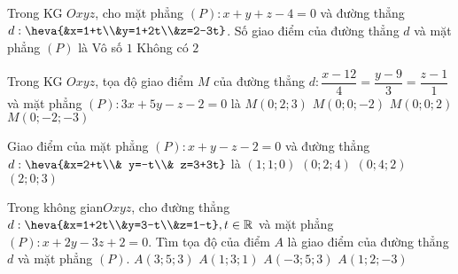 \begin{ex}%
Trong KG $Oxyz$, cho mặt phẳng $(P):x+y+z-4=0$ và đường thẳng $d:\heva{&x=1+t\\&y=1+2t\\&z=2-3t}$. Số giao điểm của đường thẳng $d$ và mặt phẳng $(P)$ là
\choice
{\True Vô số}
{$1$}
{Không có}
{$2$}
\end{ex}

\begin{ex}%
Trong KG $Oxyz$, tọa độ giao điểm $M$ của đường thẳng $d:\dfrac{x-12}{4}=\dfrac{y-9}{3}=\dfrac{z-1}{1}$ và mặt phẳng $(P):3x+5y-z-2=0$ là
\choice
{$M(0;2;3)$}
{\True $M(0;0;-2)$}
{$M(0;0;2)$}
{$M(0;-2;-3)$}
\end{ex}

\begin{ex}%
Giao điểm của mặt phẳng $(P):x+y-z-2=0$ và đường thẳng $d:\heva{&x=2+t\\& y=-t\\& z=3+3t}$ là
\choice
{\True $(1;1;0)$}
{$(0;2;4)$}
{$(0;4;2)$}
{$(2;0;3)$}
\end{ex}

\begin{ex}%
Trong không gian$ Oxyz$, cho đường thẳng $d:\heva{&x=1+2t\\&y=3-t\\&z=1-t}, t\in\mathbb{R}$ và mặt phẳng $(P):x+2y-3z+2=0$. Tìm tọa độ của điểm $A$ là giao điểm của đường thẳng $d$ và mặt phẳng $(P)$.
\choice
{$A(3;5;3)$}
{$A(1;3;1)$}
{\True $A(-3;5;3)$}
{$A(1;2;-3)$}
\end{ex}

